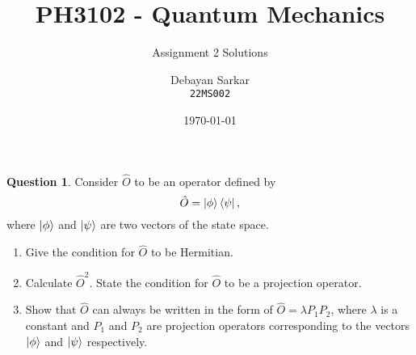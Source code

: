 \documentclass[10pt]{scrartcl}
\title{PH3102 - Quantum Mechanics}
\subtitle{Assignment 2 Solutions}
\author{Debayan Sarkar \\ \texttt{22MS002}}
\date{\today}
\theoremstyle{definition}
\newtheorem{exercise}{Question}
\begin{document}
\maketitle
\begin{exercise}
    Consider $\hat{O}$ to be an operator defined by $$\hat{O} = \ket{\phi}\bra{\psi},$$ where $\ket{\phi}$ and $\ket{\psi}$ are 
two vectors of the state space.
    \begin{enumerate}[label={(\alph*)}]
        \item Give the condition for $\hat{O}$ to be Hermitian.
        \item Calculate $\hat{O}^2$. State the condition for $\hat{O}$ to be a projection operator.
        \item Show that $\hat{O}$ can always be written in the form of $\hat{O} = \lambda P_1 P_2 $, where $\lambda$
            is a constant and $P_1$ and $P_2$ are projection operators corresponding to the vectors $\ket{\phi}$ and $\ket{\psi}$
            respectively.
    \end{enumerate}
\end{exercise}
 
\end{document}
